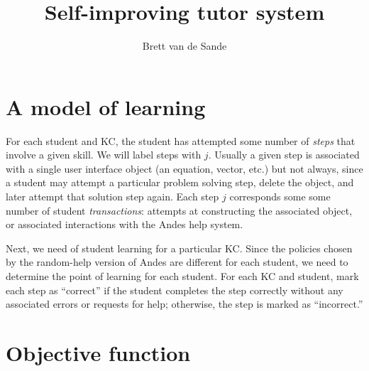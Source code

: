 \documentclass[11pt,letterpaper]{article}
\begin{document}
\title{Self-improving tutor system}
\author{Brett van de Sande}

%


\maketitle

\section{A model of learning}

For each student and KC, the student has attempted some number of 
{\em steps} that involve a given skill.   We will label
steps with $j$.  Usually a given step is associated
with a single user interface object (an equation, vector, etc.)  but
not always, since a student may attempt a particular problem solving
step, delete the object, and later attempt that solution step again.
Each step $j$ corresponds some some number of student {\em transactions}:
attempts at constructing the associated object, or associated
interactions with the Andes help system.  

Next, we need of student learning for a particular KC.
Since the policies chosen by the random-help version of Andes
are different for each student,
we need to determine the point of learning for each student.
For each KC and student, mark each step as ``correct'' if
the student completes the step correctly without any associated errors or 
requests for help; otherwise, the step is marked as ``incorrect.''


\section{Objective function}
\end{document}
